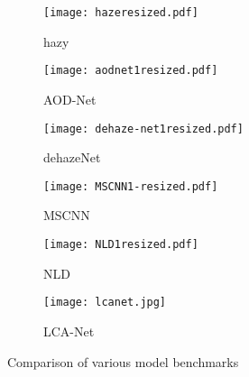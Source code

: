 \documentclass[conference]{IEEEtran}
\begin{document}
\begin{figure*}[ht!]
     \centering
\captionsetup{justification=centering}
    \begin{subfigure}[b]{0.15\textwidth}
        \texttt{[image: hazeresized.pdf]}
        \caption{hazy}
        \label{fig:hazy image}
    \end{subfigure}
    \begin{subfigure}[b]{0.15\textwidth}
        \texttt{[image: aodnet1resized.pdf]}
        \caption{AOD-Net}
        \label{fig:AOD-net}
    \end{subfigure}
    \begin{subfigure}[b]{0.15\textwidth}
        \texttt{[image: dehaze-net1resized.pdf]}
        \caption{dehazeNet} 
        \label{fig:Dehaze-net}
    \end{subfigure} 
    \begin{subfigure}[b]{0.15\textwidth}
        \texttt{[image: MSCNN1-resized.pdf]}
        \caption{MSCNN}
        \label{fig:MSCNN}
    \end{subfigure}
     \begin{subfigure}[b]{0.15\textwidth}
        \texttt{[image: NLD1resized.pdf]}
        \caption{NLD}
        \label{fig:NLD}
    \end{subfigure}
     \begin{subfigure}[b]{0.15\textwidth}
        \texttt{[image: lcanet.jpg]}
        \caption{LCA-Net}
        \label{fig:LCA-net}
    \end{subfigure}
\caption{Comparison of various model benchmarks}
\label{fig:benchmarkfig}

\end{figure*}
\end{document}
